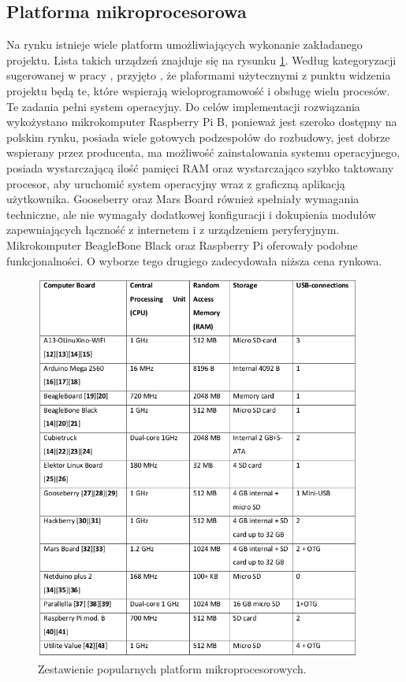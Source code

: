 \subsection{Platforma mikroprocesorowa}

Na rynku istnieje wiele platform umożliwiających wykonanie zakładanego projektu. Lista takich urządzeń znajduje się na rysunku \ref{figure:hard_comparison}. Według kategoryzacji sugerowanej w pracy \cite{bib:mobile-paradigm}, przyjęto , że plaformami użytecznymi z punktu widzenia projektu będą te, które wspierają wieloprogramowość i obsługę wielu procesów. Te zadania pełni system operacyjny. Do celów implementacji rozwiązania wykożystano mikrokomputer Raspberry Pi B, ponieważ jest szeroko dostępny na polskim rynku, posiada wiele gotowych podzespołów do rozbudowy, jest dobrze wspierany przez producenta, ma możliwość zainstalowania systemu operacyjnego, posiada wystarczającą ilość pamięci RAM oraz wystarczająco szybko taktowany procesor, aby uruchomić system operacyjny wraz z graficzną aplikacją użytkownika. Gooseberry oraz Mars Board również spełniały wymagania techniczne, ale nie wymagały dodatkowej konfiguracji i dokupienia modułów zapewniających łączność z internetem i z urządzeniem peryferyjnym. Mikrokomputer BeagleBone Black oraz Raspberry Pi oferowały podobne funkcjonalności. O wyborze tego drugiego zadecydowała niższa cena rynkowa.

\begin{figure}[ht]
  \centering
  \includegraphics[width=0.95\textwidth]{images/hard_zestawienie.png}
  \caption{Zestawienie popularnych platform mikroprocesorowych\cite{bib:mgr-rpi}.}
  \label{figure:hard_comparison}
\end{figure}

